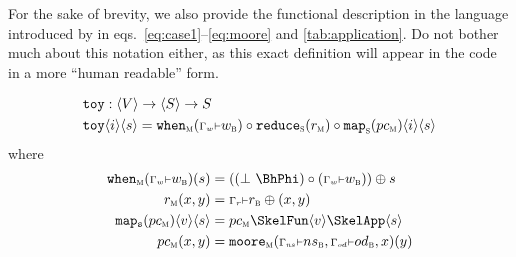 For the sake of brevity, we also provide the functional description in the language introduced by \cite{Ungureanu17} in eqs.~\eqref{eq:case1}--\eqref{eq:moore} and \cref{tab:application}. Do not bother much about this notation either, as this exact definition will appear in the code in a more ``human readable'' form.

\begin{align}
  \mathtt{toy}& : \SkelVec{V} \rightarrow
                \SkelVec{S} \rightarrow S \label{eq:case1}\\
  \mathtt{toy} &\SkelVec{i}\SkelVec{s} =
                 \mathtt{when}_{\textsc{m}}(\context{\Gamma_w}{w_{\textsc{b}}}) \circ
                 \mathtt{reduce}_{\textsc{s}}(r_{\textsc{m}}) \circ
                 \mathtt{map}_{\textsc{s}}(pc_{\textsc{m}})\SkelVec{i}\SkelVec{s}
                 \nonumber
\end{align}%
where%
\begin{align}
  \mathtt{when}_{\textsc{m}} (\context{\Gamma_w}{w_{\textsc{b}}})(s)
  & = ((\bot\ \BhPhi) \circ (\context{\Gamma_w}{w_{\textsc{b}}}))
    \oplus s \label{eq:when}\\
  r_{\textsc{m}}(x,y) &= \context{\Gamma_r}{r_{\textsc{b}}} \oplus (x,y) \\
  \mathtt{map_{s}}(pc_{\textsc{m}})\SkelVec{v}\SkelVec{s}
  &= pc_{\textsc{m}} \SkelFun \SkelVec{v} \SkelApp
    \SkelVec{s} \label{eq:re-map}\\
  pc_{\textsc{m}}(x,y)
  &= \mathtt{moore}_{\textsc{m}} (%
    \context{\Gamma_{\mathit ns}}{ns_{\textsc{b}}},
    \context{\Gamma_{\mathit od}}{od_{\textsc{b}}},x)(y)\label{eq:moore}
\end{align}

